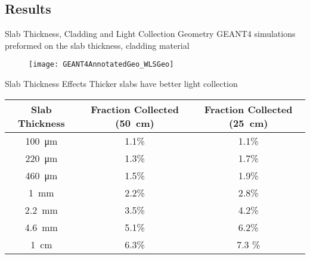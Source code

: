 \subsection{Results}
\begin{frame}{Slab Thickness, Cladding and Light Collection Geometry}
GEANT4 simulations preformed on the slab thickness, cladding material
  \begin{figure}
    \centering
    \texttt{[image: GEANT4AnnotatedGeo\_WLSGeo]}
  \end{figure}
\hyperlink{G4Intro}{}
\end{frame}
\begin{frame}{Slab Thickness Effects}
Thicker slabs have better light collection
\begin{table}
	\small
  \begin{tabular}{c | c  c}
	\toprule
	Slab Thickness & Fraction Collected (\SI{50}{\cm}) & Fraction Collected (\SI{25}{\cm}) \\
	\midrule
	\SI{100}{\um} & 1.1\% & 1.1\% \\
	\SI{220}{\um} & 1.3\% & 1.7\% \\
	\SI{460}{\um} & 1.5\% & 1.9\% \\
	\SI{1}{\mm} & 2.2\% & 2.8\% \\
	\SI{2.2}{\mm} & 3.5\% & 4.2\% \\
	\SI{4.6}{\mm} & 5.1\% & 6.2\% \\
	\SI{1}{\cm} & 6.3\% & 7.3 \% \\
	\bottomrule
	\end{tabular}
\end{table}
\end{frame}
